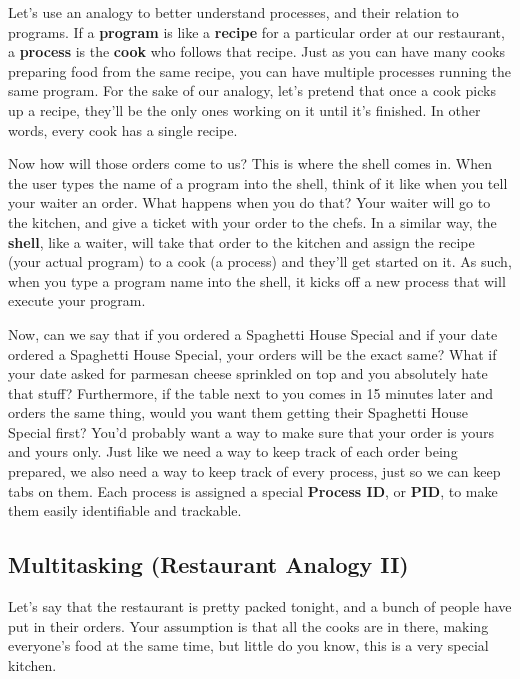 \documentclass[english, 10pt]{article}
\begin{document}
Let's use an analogy to better understand processes, and their relation to programs. If a \textbf{program} is like a \textbf{recipe} for a particular order at our restaurant, a \textbf{process} is the \textbf{cook} who follows that recipe. Just as you can have many cooks preparing food from the same recipe, you can have multiple processes running the same program. For the sake of our analogy, let's pretend that once a cook picks up a recipe, they'll be the only ones working on it until it's finished. In other words, every cook has a single recipe.\newline

Now how will those orders come to us? This is where the shell comes in. When the user types the name of a program into the shell, think of it like when you tell your waiter an order. What happens when you do that? Your waiter will go to the kitchen, and give a ticket with your order to the chefs. In a similar way, the \textbf{shell}, like a waiter, will take that order to the kitchen and assign the recipe (your actual program) to a cook (a process) and they'll get started on it. As such, when you type a program name into the shell, it kicks off a new process that will execute your program.\newline

Now, can we say that if you ordered a Spaghetti House Special and if your date ordered a Spaghetti House Special, your orders will be the exact same?  What if your date asked for parmesan cheese sprinkled on top and you absolutely hate that stuff? Furthermore, if the table next to you comes in 15 minutes later and orders the same thing, would you want them getting their Spaghetti House Special first? You'd probably want a way to make sure that your order is yours and yours only. Just like we need a way to keep track of each order being prepared, we also need a way to keep track of every process, just so we can keep tabs on them. Each process is assigned a special \textbf{Process ID}, or \textbf{PID}, to make them easily identifiable and trackable.

\subsection{Multitasking (Restaurant Analogy II)}

Let's say that the restaurant is pretty packed tonight, and a bunch of people have put in their orders. Your assumption is that all the cooks are in there, making everyone's food at the same time, but little do you know, this is a very special kitchen.\newline
\end{document}

